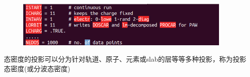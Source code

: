 {%
\begin{figure}[h!]
\centering
\includegraphics[height=0.9in,viewport=0 0 500 120,clip]{Figures/Pt_surface-DOS-INCAR.png}
\caption{\fontsize{6.2pt}{5.2pt}}%
\label{Pt_surface-DOS-INCAR}
\end{figure}
	态密度的投影可以分为针对轨道、原子、元素或\textrm{slab}的层等等多种投影，称为投影态密度(或分波态密度)%
}

